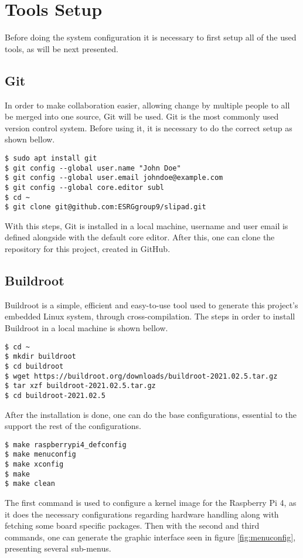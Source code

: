\section{Tools Setup}
Before doing the system configuration it is necessary to first setup all of the used tools, as will be next presented.

\subsection{Git}
In order to make collaboration easier, allowing change by multiple people to all be merged into one source, Git will be used. Git is the most commonly used version control system. Before using it, it is necessary to do the correct setup as shown bellow.
\begin{lstlisting}
$ sudo apt install git
$ git config --global user.name "John Doe"
$ git config --global user.email johndoe@example.com
$ git config --global core.editor subl
$ cd ~
$ git clone git@github.com:ESRGgroup9/slipad.git
\end{lstlisting}

With this steps, Git is installed in a local machine, username and user email is defined alongside with the default core editor. After this, one can clone the repository for this project, created in GitHub.

\subsection{Buildroot}
Buildroot is a simple, efficient and easy-to-use tool used to generate this project's embedded Linux system, through cross-compilation. The steps in order to install Buildroot in a local machine is shown bellow.

\begin{lstlisting}
$ cd ~
$ mkdir buildroot
$ cd buildroot
$ wget https://buildroot.org/downloads/buildroot-2021.02.5.tar.gz
$ tar xzf buildroot-2021.02.5.tar.gz
$ cd buildroot-2021.02.5
\end{lstlisting}

After the installation is done, one can do the base configurations, essential to the support the rest of the configurations.
\begin{lstlisting}
$ make raspberrypi4_defconfig
$ make menuconfig
$ make xconfig
$ make 
$ make clean
\end{lstlisting}

The first command is used to configure a kernel image for the Raspberry Pi 4, as it does the necessary configurations regarding hardware handling along with fetching some board specific packages. Then with the second and third commands, one can generate the graphic interface seen in figure \ref{fig:menuconfig}, presenting several sub-menus. 

